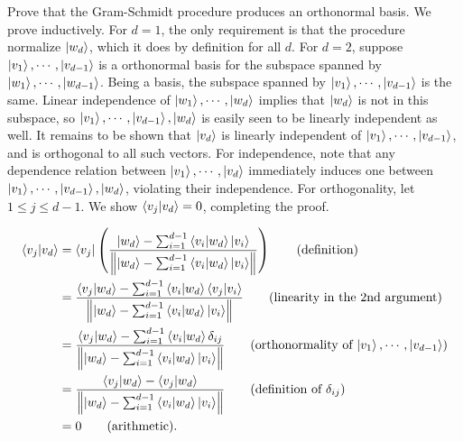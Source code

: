  Prove that the Gram-Schmidt procedure produces an orthonormal basis.
\Soln
We prove inductively.  For $d = 1$, the only requirement is that the procedure normalize $\ket{w_d}$, which it does by definition for all $d$.   For $d = 2$, suppose $\ket{v_1}, \cdots,\ket{v_{d-1}}$ is a orthonormal basis for the subspace spanned by  $\ket{w_1},\cdots,\ket{w_{d-1}}$.  Being a basis, the subspace spanned by $\ket{v_1},\cdots,\ket{v_{d-1}}$ is the same.  Linear independence of $\ket{w_1},\cdots,\ket{w_d}$ implies that $\ket{w_d}$ is not in this subspace, so $\ket{v_1},\cdots,\ket{v_{d-1}},\ket{w_d}$ is easily seen to be linearly independent as well.  It remains to be shown that $\ket{v_d}$ is linearly independent of $\ket{v_1},\cdots,\ket{v_{d-1}}$, and is orthogonal to all such vectors.  For independence, note that any dependence relation between $\ket{v_1},\cdots,\ket{v_d}$ immediately induces one between $\ket{v_1},\cdots,\ket{v_{d-1}},\ket{w_d}$, violating their independence.  For orthogonality, let $1\leq j\leq d-1$.  We show $\braket{v_j|v_d} = 0$, completing the proof.
\begin{comment}
\begin{align*}
	\ket{v_2} &= \frac{\ket{w_2} - \braket{v_1 | w_2}\ket{v_1}}{\norm{\ket{w_2} - \braket{v_1 | w_2}\ket{v_1}}}\\
	\braket{v_1 | v_2} &= \bra{v_1} \left(\frac{\ket{w_2} - \braket{v_1 | w_2}\ket{v_1}}{\norm{\ket{w_2} - \braket{v_1 | w_2}\ket{v_1}}}\right)\\
		&= \frac{\braket{v_1 | w_2} - \braket{v_1 | w_2}\braket{v_1 | v_1}}{\norm{\ket{w_2} - \braket{v_1 | w_2}\ket{v_1}}}\\
		&= 0.
\end{align*}
\end{comment}
\begin{align*}
	\braket{v_j | v_d} &= \bra{v_j} \left(\frac{\ket{w_d} - \sum_{i=1}^{d-1}\braket{v_i | w_d}\ket{v_i}}{\norm{\ket{w_d} - \sum_{i=1}^{d-1}\braket{v_i | w_d}\ket{v_i}}}\right) \tag{definition}\\
	&= \frac{\braket{v_j | w_d} - \sum_{i=1}^{d-1}\braket{v_i | w_d}\braket{v_j | v_i}}{\norm{\ket{w_d} - \sum_{i=1}^{d-1}\braket{v_i | w_d}\ket{v_i}}} \tag{linearity in the 2nd argument}\\
	&= \frac{\braket{v_j | w_d} - \sum_{i=1}^{d-1}\braket{v_i | w_d}\delta_{ij}}{\norm{\ket{w_d} - \sum_{i=1}^{d-1}\braket{v_i | w_d}\ket{v_i}}} \tag{orthonormality of $\ket{v_1},\cdots,\ket{v_{d-1}}$}\\
	&= \frac{\braket{v_j | w_d} - \braket{v_j | w_d}}{\norm{\ket{w_d} - \sum_{i=1}^{d-1}\braket{v_i | w_d}\ket{v_i}}} \tag{definition of $\delta_{ij}$}\\
	&= 0 \tag{arithmetic}.
\end{align*}

